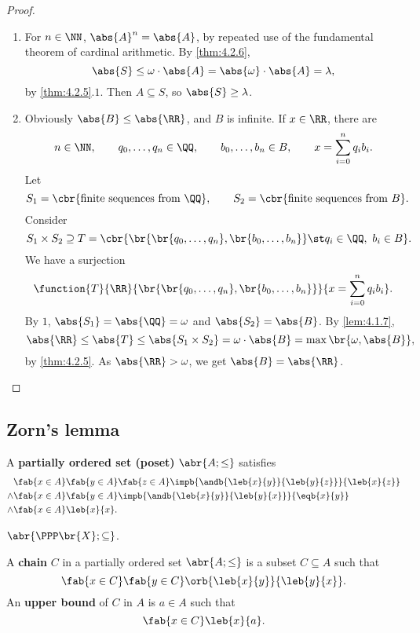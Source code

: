 \begin{proof}
\hfill
\begin{enumerate}
\item For $ n \in \NN $, $ \abs{A}^n = \abs{A} $, by repeated use of the fundamental theorem of cardinal arithmetic. By \ref{thm:4.2.6},
$$ \abs{S} \le \omega \cdot \abs{A} = \abs{\omega} \cdot \abs{A} = \lambda, $$
by \ref{thm:4.2.5}.$ 1 $. Then $ A \subseteq S $, so $ \abs{S} \ge \lambda $.
\item Obviously $ \abs{B} \le \abs{\RR} $, and $ B $ is infinite. If $ x \in \RR $, there are
$$ n \in \NN, \qquad q_0, \dots, q_n \in \QQ, \qquad b_0, \dots, b_n \in B, \qquad x = \sum_{i = 0}^n q_ib_i. $$
Let
$$ S_1 = \cbr{\text{finite sequences from} \ \QQ}, \qquad S_2 = \cbr{\text{finite sequences from} \ B}. $$
Consider
$$ S_1 \times S_2 \supseteq T = \cbr{\br{\br{q_0, \dots, q_n}, \br{b_0, \dots, b_n}} \st q_i \in \QQ, \ b_i \in B}. $$
We have a surjection
$$ \function{T}{\RR}{\br{\br{q_0, \dots, q_n}, \br{b_0, \dots, b_n}}}{x = \sum_{i = 0}^n q_ib_i}. $$
By $ 1 $, $ \abs{S_1} = \abs{\QQ} = \omega $ and $ \abs{S_2} = \abs{B} $. By \ref{lem:4.1.7},
$$ \abs{\RR} \le \abs{T} \le \abs{S_1 \times S_2} = \omega \cdot \abs{B} = \max\br{\omega, \abs{B}}, $$
by \ref{thm:4.2.5}. As $ \abs{\RR} > \omega $, we get $ \abs{B} = \abs{\RR} $.
\end{enumerate}
\end{proof}

\pagebreak

\subsection{Zorn's lemma}


A \textbf{partially ordered set (poset)} $ \abr{A; \le} $ satisfies
\begin{align*}
& \fab{x \in A}\fab{y \in A}\fab{z \in A}\impb{\andb{\leb{x}{y}}{\leb{y}{z}}}{\leb{x}{z}} \\
\land & \fab{x \in A}\fab{y \in A}\impb{\andb{\leb{x}{y}}{\leb{y}{x}}}{\eqb{x}{y}} \\
\land & \fab{x \in A}\leb{x}{x}.
\end{align*}

\begin{example*}
$ \abr{\PPP\br{X}; \subseteq} $.
\end{example*}

A \textbf{chain} $ C $ in a partially ordered set $ \abr{A; \le} $ is a subset $ C \subseteq A $ such that
$$ \fab{x \in C}\fab{y \in C}\orb{\leb{x}{y}}{\leb{y}{x}}. $$
An \textbf{upper bound} of $ C $ in $ A $ is $ a \in A $ such that
$$ \fab{x \in C}\leb{x}{a}. $$

